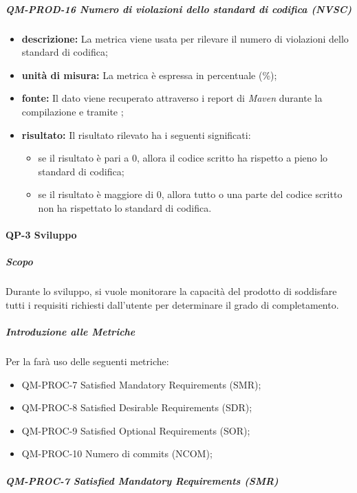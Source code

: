 			\subparagraph{QM-PROD-16 Numero di violazioni dello standard di codifica (NVSC)}
			\begin{itemize}
      			\item \textbf{descrizione: }
					La metrica viene usata per rilevare il numero di violazioni dello standard di codifica;
				\item \textbf{unità di misura: }
					La metrica è espressa in percentuale (\%);
				\item \textbf{fonte: }
					Il dato viene recuperato attraverso i report di \textit{Maven} durante la compilazione e tramite ;
				\item \textbf{risultato: }
					Il risultato rilevato ha i seguenti significati:
					\begin{itemize}
						\item se il risultato è pari a 0, allora il codice scritto ha rispetto a pieno lo standard di codifica;
						\item se il risultato è maggiore di 0, allora tutto o una parte del codice scritto non ha rispettato lo standard di codifica.
					\end{itemize}
			\end{itemize}



		\paragraph{QP-3 Sviluppo}
			\subparagraph{Scopo}
			Durante lo sviluppo, si vuole monitorare la capacità del prodotto di soddisfare tutti i requisiti richiesti dall'utente per determinare il grado di completamento.

			\subparagraph{Introduzione alle Metriche}
			Per la  farà uso delle seguenti metriche:

			\begin{itemize}
				\item QM-PROC-7 Satisfied Mandatory Requirements (SMR);
				\item QM-PROC-8 Satisfied Desirable Requirements (SDR);
				\item QM-PROC-9 Satisfied Optional Requirements (SOR);
				\item QM-PROC-10 Numero di commits (NCOM);
			\end{itemize}

			\subparagraph{QM-PROC-7 Satisfied Mandatory Requirements (SMR)}

